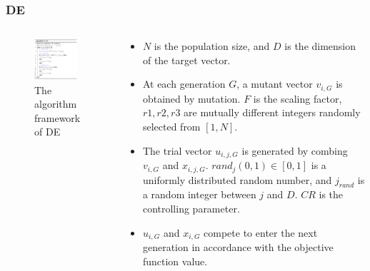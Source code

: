 \documentclass[xcolor=dvipsnames]{beamer}
\begin{document}
    \begin{frame}
    \frametitle{DE}

    \begin{columns}
        \begin{column}{0.5\textwidth}
        \begin{figure}[H]
            \graphicspath{{figs/}}
            \includegraphics[width=0.9\textwidth]{de.png}
            \caption{The algorithm framework of DE}
        \end{figure}
    \end{column}
    \begin{column}{0.5\textwidth}
    \begin{itemize}\small
    \setlength\itemsep{0em}
      \item $N$ is the population size, and $D$ is the dimension of the target vector.
      \item At each generation $G$, a mutant vector $v_{i,G}$ is obtained by mutation. $F$ is the scaling factor, $r1, r2, r3$ are mutually different integers randomly selected from $[1,N]$.
      \item The trial vector $u_{i,j,G}$ is generated by combing $v_{i,G}$ and $x_{i,j,G}$. $rand_j(0,1)\in[0, 1]$ is a uniformly distributed random number, and $j_{rand}$ is a random integer between $j$ and $D$. $CR$ is the controlling parameter.
      \item $u_{i,G}$ and $x_{i,G}$ compete to enter the next generation in accordance with the objective function value.
    \end{itemize}
    \end{column}
    \end{columns}
    
    \end{frame}
\end{document}
